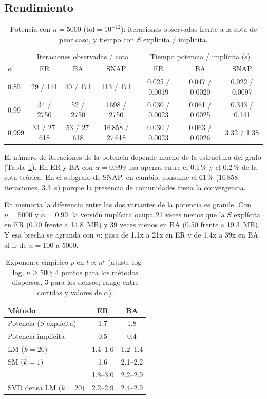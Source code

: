 \documentclass[11pt,a4paper]{article}
\newcommand{\code}[1]{\texttt{\detokenize{#1}}}
\begin{document}
\subsection{Rendimiento}
\begin{table}[!htbp]
\centering\small\setlength{\tabcolsep}{4pt}
\begin{tabular}{@{}lcccccc@{}}
\toprule
 & \multicolumn{3}{c}{Iteraciones observadas / cota} & \multicolumn{3}{c}{Tiempo potencia / impl\'icita (s)}\\
 $\alpha$ & ER & BA & SNAP & ER & BA & SNAP\\
\midrule
0.85  & 29 / 171     & 40 / 171     & 113 / 171       & 0.025 / 0.0019 & 0.047 / 0.0020 & 0.022 / 0.0097\\
0.99  & 34 / 2750    & 52 / 2750    & 1698 / 2750     & 0.030 / 0.0023 & 0.061 / 0.0025 & 0.343 / 0.141\\
0.999 & 34 / 27\,618 & 53 / 27\,618 & 16\,858 / 27\,618 & 0.030 / 0.0023 & 0.063 / 0.0026 & 3.32 / 1.38\\
\bottomrule
\end{tabular}
\caption{Potencia con $n=5000$ ($\mathrm{tol}=10^{-12}$): iteraciones observadas frente a la cota de peor caso, y tiempo con $S$ expl\'icita / impl\'icita.}
\label{tab:iters}
\end{table}

El n\'umero de iteraciones de la potencia depende mucho de la estructura del grafo (Tabla~\ref{tab:iters}). En ER y BA con $\alpha=0.999$ usa apenas entre el 0.1\,\% y el 0.2\,\% de la cota te\'orica. En el subgrafo de SNAP, en cambio, consume el 61\,\% (16\,858 iteraciones, 3.3~s) porque la presencia de comunidades frena la convergencia.

En memoria la diferencia entre las dos variantes de la potencia es grande. Con $n=5000$ y $\alpha=0.99$, la versi\'on impl\'icita ocupa 21 veces menos que la $S$ expl\'icita en ER (0.70 frente a 14.8~MB) y 39 veces menos en BA (0.50 frente a 19.3~MB). Y esa brecha se agranda con $n$: pasa de 1.1x a 21x en ER y de 1.4x a 39x en BA al ir de $n=100$ a $5000$.

\begin{table}[!htbp]
\centering\small\setlength{\tabcolsep}{6pt}
\begin{tabular}{@{}lcc@{}}
\toprule
M\'etodo & ER & BA\\
\midrule
Potencia ($S$ expl\'icita)      & 1.7 & 1.8\\
Potencia impl\'icita            & 0.5 & 0.4\\
\code{svds} LM ($k=20$)         & 1.4--1.6 & 1.2--1.4\\
\code{svds} SM ($k=1$)          & 1.6 & 2.1--2.2\\
\code{pinv}                     & 1.8--3.0 & 2.2--2.9\\
SVD densa LM ($k=20$)           & 2.2--2.9 & 2.4--2.9\\
\bottomrule
\end{tabular}
\caption{Exponente emp\'irico $p$ en $t\propto n^p$ (ajuste log--log, $n\ge500$; 4 puntos para los m\'etodos dispersos, 3 para los densos; rango entre corridas y valores de $\alpha$).}
\label{tab:exp}
\end{table}
\end{document}
